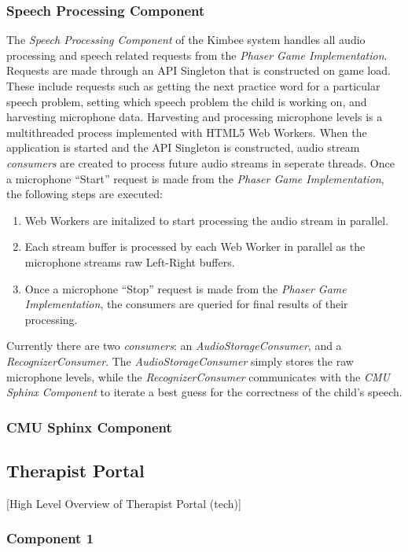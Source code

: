 \documentclass{sig-alternate-2013}
\begin{document}
\subsubsection{Speech Processing Component}
The {\em Speech Processing Component} of the Kimbee system handles all audio processing and speech related requests from the {\em Phaser Game Implementation}. Requests are made through an API Singleton that is constructed on game load. These include requests such as getting the next practice word for a particular speech problem, setting which speech problem the child is working on, and harvesting microphone data. Harvesting and processing microphone levels is a multithreaded process implemented with HTML5 Web Workers. When the application is started and the API Singleton is constructed, audio stream {\em consumers} are created to process future audio streams in seperate threads. Once a microphone ``Start'' request is made from the {\em Phaser Game Implementation}, the following steps are executed:
\begin{enumerate}
  \item
    Web Workers are initalized to start processing the audio stream in parallel.
  \item
    Each stream buffer is processed by each Web Worker in parallel as the microphone streams raw Left-Right buffers.
  \item
    Once a microphone ``Stop'' request is made from the {\em Phaser Game Implementation}, the consumers are queried for final results of their processing.
\end{enumerate}
Currently there are two {\em consumers}: an {\em AudioStorageConsumer}, and a {\em RecognizerConsumer}. The {\em AudioStorageConsumer} simply stores the raw microphone levels, while the {\em RecognizerConsumer} communicates with the {\em CMU Sphinx Component} to iterate a best guess for the correctness of the child's speech.

\subsubsection{CMU Sphinx Component}


\subsection{Therapist Portal}

[High Level Overview of Therapist Portal (tech)]

\subsubsection{Component 1}
\end{document}
